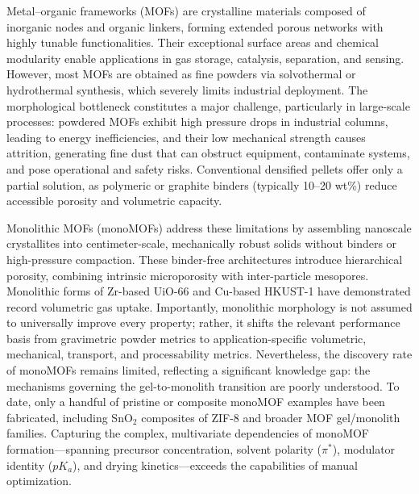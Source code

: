 \documentclass[12pt,a4paper]{article}
\begin{document}
Metal–organic frameworks (MOFs) are crystalline materials composed of inorganic nodes and organic linkers, forming extended porous networks with highly tunable functionalities.\cite{ref1} Their exceptional surface areas and chemical modularity enable applications in gas storage, catalysis, separation, and sensing. However, most MOFs are obtained as fine powders via solvothermal or hydrothermal synthesis, which severely limits industrial deployment. The morphological bottleneck constitutes a major challenge, particularly in large-scale processes: powdered MOFs exhibit high pressure drops in industrial columns, leading to energy inefficiencies, and their low mechanical strength causes attrition, generating fine dust that can obstruct equipment, contaminate systems, and pose operational and safety risks. Conventional densified pellets offer only a partial solution, as polymeric or graphite binders (typically 10–20 wt\%) reduce accessible porosity and volumetric capacity.

Monolithic MOFs (monoMOFs) address these limitations by assembling nanoscale crystallites into centimeter-scale, mechanically robust solids without binders or high-pressure compaction.\cite{ref2} These binder-free architectures introduce hierarchical porosity, combining intrinsic microporosity with inter-particle mesopores. Monolithic forms of Zr-based UiO-66\cite{ref4} and Cu-based HKUST-1\cite{ref5} have demonstrated record volumetric gas uptake. Importantly, monolithic morphology is not assumed to universally improve every property; rather, it shifts the relevant performance basis from gravimetric powder metrics to application-specific volumetric, mechanical, transport, and processability metrics. Nevertheless, the discovery rate of monoMOFs remains limited, reflecting a significant knowledge gap: the mechanisms governing the gel-to-monolith transition are poorly understood.\cite{ref6} To date, only a handful of pristine or composite monoMOF examples have been fabricated, including SnO$_2$ composites of ZIF-8\cite{ref7} and broader MOF gel/monolith families.\cite{ref6} Capturing the complex, multivariate dependencies of monoMOF formation—spanning precursor concentration, solvent polarity ($\pi^*$), modulator identity ($pK_a$), and drying kinetics—exceeds the capabilities of manual optimization.\cite{ref9}
\end{document}

